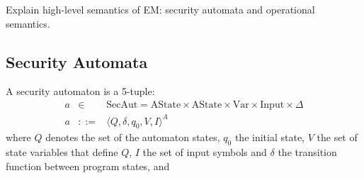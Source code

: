 \documentclass[10pt,notitlepage,twoside]{article}
\newcommand{\aut}{a}
\newcommand{\automata}[5]{\langle #1,#2,#3,#4,#5 \rangle^A}
\newcommand{\theautomaton}{\automata{Q}{\delta}{q_0}{V}{I}}
\begin{document}
Explain high-level semantics of EM: security automata and operational semantics. 


\subsection{Security Automata}


A security automaton is a 5-tuple:
\begin{displaymath}
\begin{array}{rcl}
\aut & \in & \textrm{SecAut} = \textrm{AState} \times \textrm{AState} \times \textrm{Var} \times \textrm{Input} \times \Delta \\
\aut & ::= & \theautomaton
\end{array}
\end{displaymath}
where $Q$ denotes the set of the automaton states, $q_0$ the initial state, $V$ the set of state variables that define $Q$, $I$ the set of input symbols and $\delta$ the transition function between program states, and
\end{document}
